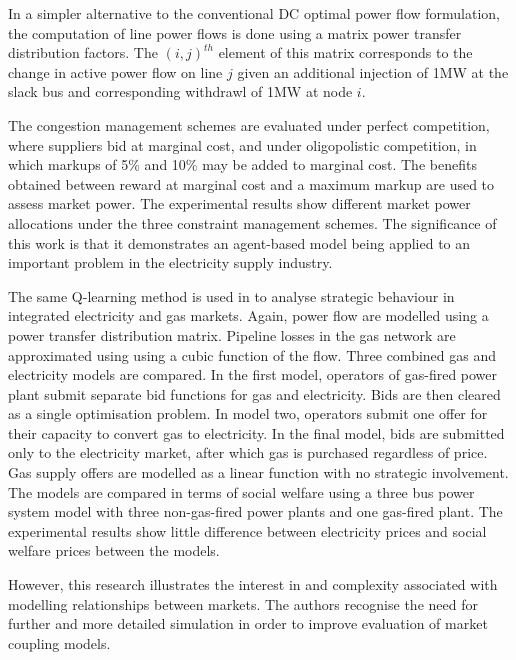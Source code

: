 In a simpler alternative to the conventional DC optimal power flow formulation,
the computation of line power flows is done using a matrix power transfer
distribution factors.  The $(i,j)^{th}$ element of this matrix corresponds to
the change in active power flow on line $j$ given an additional injection of
1MW at the slack bus and corresponding withdrawl of 1MW at node $i$.

The congestion management schemes are evaluated under perfect competition, where
suppliers bid at marginal cost, and under oligopolistic competition, in which
markups of 5\% and 10\% may be added to marginal cost.  The benefits obtained
between reward at marginal cost and a maximum markup are used to assess market
power.  The experimental results show different market power allocations under
the three constraint management schemes.  The significance of this work is that
it demonstrates an agent-based model being applied to an important problem in
the electricity supply industry.

The same Q-learning method is used in \cite{krause:gas} to analyse strategic
behaviour in integrated electricity and gas markets.  Again, power flow are
modelled using a power transfer distribution matrix.  Pipeline losses in the
gas network are approximated using using a cubic function of the flow.  Three
combined gas and electricity models are compared.  In the first model,
operators of gas-fired power plant submit separate bid functions for gas and
electricity.  Bids are then cleared as a single optimisation problem.  In model
two, operators submit one offer for their capacity to convert gas to
electricity.  In the final model, bids are submitted only to the electricity
market, after which gas is purchased regardless of price.  Gas supply offers are
modelled as a linear function with no strategic involvement.  The models are
compared in terms of social welfare using a three bus power system model with
three non-gas-fired power plants and one gas-fired plant.  The experimental
results show little difference between electricity prices and social welfare
prices between the models.

However, this research illustrates the interest in and complexity associated
with modelling relationships between markets.  The authors recognise the need
for further and more detailed simulation in order to improve evaluation of
market coupling models.



